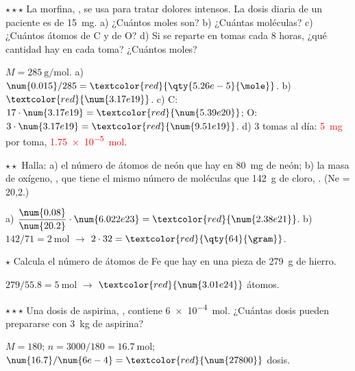 \begin{exercise}
    \(\star\star\star\) La morfina, , se usa para tratar dolores intensos. La dosis diaria de un paciente es de
    \qty{15}{\milli\gram}. a) ¿Cuántos moles son? b) ¿Cuántas moléculas? c) ¿Cuántos átomos de C y de O? d) Si se reparte en tomas cada
    8 horas, ¿qué cantidad hay en cada toma? ¿Cuántos moles?
    \begin{solu}
        \(M = \qty{285}{\gram\per\mole}\). a) \(\num{0.015}/285 = \textcolor{red}{\qty{5.26e-5}{\mole}}\). b) \(\textcolor{red}{\num{3.17e19}}\).
        c) C: \(17 \cdot \num{3.17e19} = \textcolor{red}{\num{5.39e20}}\); O: \(3 \cdot \num{3.17e19} = \textcolor{red}{\num{9.51e19}}\).
        d) 3 tomas al día: \textcolor{red}{\qty{5}{\milli\gram}} por toma, \textcolor{red}{\qty{1.75e-5}{\mole}}.
    \end{solu}
\end{exercise}

\begin{exercise}
    \(\star\star\) Halla: a) el número de átomos de neón que hay en \qty{80}{\milli\gram} de neón; b) la masa de oxígeno, , que
    tiene el mismo número de moléculas que \qty{142}{\gram} de cloro, . (Ne = 20,2.)
    \begin{solu}
        a) \(\dfrac{\num{0.08}}{\num{20.2}} \cdot \num{6.022e23} = \textcolor{red}{\num{2.38e21}}\). b) \(142/71 = \qty{2}{\mole}\) \(\rightarrow\)
        \(2 \cdot 32 = \textcolor{red}{\qty{64}{\gram}}\).
    \end{solu}
\end{exercise}

\begin{exercise}
    \(\star\) Calcula el número de átomos de Fe que hay en una pieza de \qty{279}{\gram} de hierro.
    \begin{solu}
        \(279/\num{55.8} = \qty{5}{\mole}\) \(\rightarrow\) \(\textcolor{red}{\num{3.01e24}}\) átomos.
    \end{solu}
\end{exercise}

\begin{exercise}
    \(\star\star\star\) Una dosis de aspirina, , contiene \qty{6e-4}{\mole}. ¿Cuántas dosis pueden prepararse con
    \qty{3}{\kilogram} de aspirina?
    \begin{solu}
        \(M = 180\); \(n = 3000/180 = \qty{16.7}{\mole}\); \(\num{16.7}/\num{6e-4} = \textcolor{red}{\num{27800}}\) dosis.
    \end{solu}
\end{exercise}

